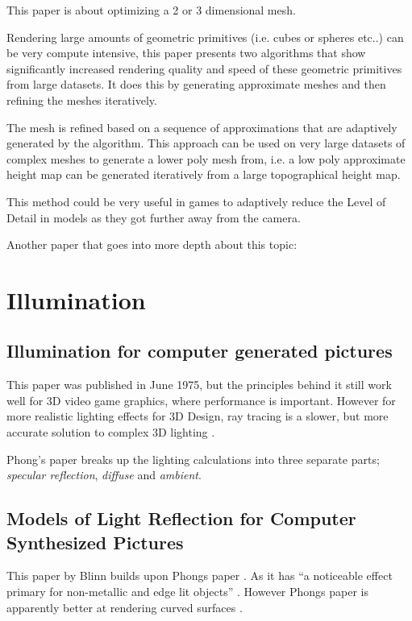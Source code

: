 \documentclass{scrartcl}
\begin{document}
This paper is about optimizing a 2 or 3 dimensional mesh. 

Rendering large amounts  of geometric primitives (i.e. cubes or spheres etc..) can be very compute intensive, this paper presents two algorithms that show significantly increased rendering quality and speed of these geometric primitives from large datasets. It does this by generating approximate meshes and then refining the meshes iteratively. 

The mesh is refined based on a sequence of approximations that are adaptively generated by the algorithm. This approach can be used on very large datasets of complex meshes to generate a lower poly mesh from, i.e. a low poly approximate height map can be generated iteratively from a large topographical height map.

This method could be very useful in games to adaptively reduce the Level of Detail in models as they got further away from the camera.


Another paper that goes into more depth about this topic:
\cite{carey1981mesh}










\section{Illumination}
\subsection{Illumination for computer generated pictures \cite{phong1975illumination}}

This paper was published in June 1975, but the principles behind it still work well for 3D video game graphics, where performance is important. However for more realistic lighting effects for 3D Design, ray tracing is a slower, but more accurate solution to complex 3D lighting \cite{Shirley:2005:RayTracing}.

Phong's paper breaks up the lighting calculations into three separate parts; \textit{specular reflection}, \textit{diffuse} and \textit{ambient}.



\subsection{Models of Light Reflection for Computer Synthesized Pictures \cite{Blinn1977}}
This paper by Blinn builds upon Phongs paper \cite{phong1975illumination}. As it has ``a noticeable effect primary for non-metallic and edge lit objects'' \cite{Blinn1977}. 
However Phongs paper is apparently better at rendering curved surfaces \cite{Blinn1977}.
\end{document}
